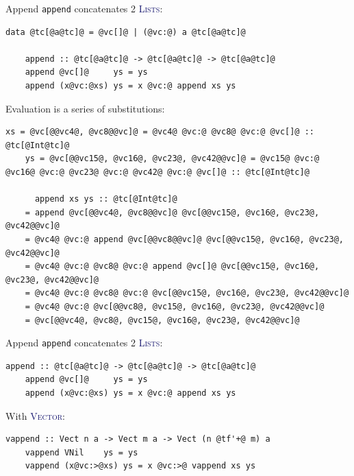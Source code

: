 \documentclass[xcolor={usenames,dvipsnames}]{beamer}
\newcommand{\htycon}[1]{\textcolor{MidnightBlue}{\textsc{#1}}}
\begin{document}
\begin{frame}[fragile]{Append}
  \texttt{append} concatenates 2 \htycon{Lists}:
  \begin{lstlisting}[style=hask]
    data @tc[@a@tc]@ = @vc[]@ | (@vc:@) a @tc[@a@tc]@

    append :: @tc[@a@tc]@ -> @tc[@a@tc]@ -> @tc[@a@tc]@
    append @vc[]@     ys = ys
    append (x@vc:@xs) ys = x @vc:@ append xs ys
  \end{lstlisting}

  Evaluation is a series of substitutions:
  \begin{lstlisting}[style=hask]
    xs = @vc[@@vc4@, @vc8@@vc]@ = @vc4@ @vc:@ @vc8@ @vc:@ @vc[]@ :: @tc[@Int@tc]@
    ys = @vc[@@vc15@, @vc16@, @vc23@, @vc42@@vc]@ = @vc15@ @vc:@ @vc16@ @vc:@ @vc23@ @vc:@ @vc42@ @vc:@ @vc[]@ :: @tc[@Int@tc]@

      append xs ys :: @tc[@Int@tc]@
    = append @vc[@@vc4@, @vc8@@vc]@ @vc[@@vc15@, @vc16@, @vc23@, @vc42@@vc]@
    = @vc4@ @vc:@ append @vc[@@vc8@@vc]@ @vc[@@vc15@, @vc16@, @vc23@, @vc42@@vc]@
    = @vc4@ @vc:@ @vc8@ @vc:@ append @vc[]@ @vc[@@vc15@, @vc16@, @vc23@, @vc42@@vc]@
    = @vc4@ @vc:@ @vc8@ @vc:@ @vc[@@vc15@, @vc16@, @vc23@, @vc42@@vc]@
    = @vc4@ @vc:@ @vc[@@vc8@, @vc15@, @vc16@, @vc23@, @vc42@@vc]@
    = @vc[@@vc4@, @vc8@, @vc15@, @vc16@, @vc23@, @vc42@@vc]@
  \end{lstlisting}
\end{frame}

\begin{frame}[fragile]{Append}
  \texttt{append} concatenates 2 \htycon{Lists}:
  \begin{lstlisting}[style=hask]
    append :: @tc[@a@tc]@ -> @tc[@a@tc]@ -> @tc[@a@tc]@
    append @vc[]@     ys = ys
    append (x@vc:@xs) ys = x @vc:@ append xs ys
  \end{lstlisting}

  With \htycon{Vector}:
  \begin{lstlisting}[style=hask]
    vappend :: Vect n a -> Vect m a -> Vect (n @tf'+@ m) a
    vappend VNil    ys = ys
    vappend (x@vc:>@xs) ys = x @vc:>@ vappend xs ys
  \end{lstlisting}
\end{frame}
\end{document}
